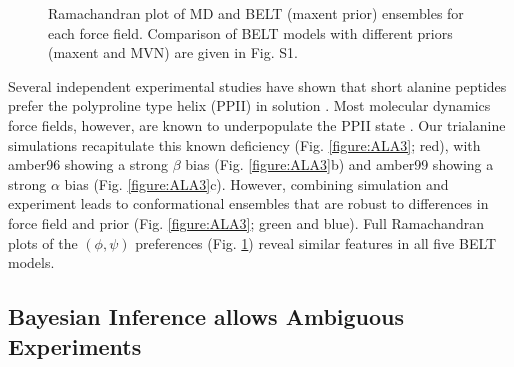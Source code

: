 \documentclass[11pt,titlepage]{article}
\begin{document}
\begin{figure}

\caption{
Ramachandran plot of MD and BELT (maxent prior) ensembles for each force field.  Comparison of BELT models with different priors (maxent and MVN) are given in Fig. S1.  
}
\label{figure:Rama}
\end{figure}

Several independent experimental studies have shown that short alanine peptides prefer the polyproline type helix (PPII) in solution \citep{Grdadolnik2011, Graf2007, Avbelj2006}.  Most molecular dynamics force fields, however, are known to underpopulate the PPII state \citep{Graf2007,beauchamp2012protein,Nerenberg2011, Best2008}.  Our trialanine simulations recapitulate this known deficiency (Fig. \ref{figure:ALA3}; red), with amber96 showing a strong $\beta$ bias (Fig. \ref{figure:ALA3}b) and amber99 showing a strong $\alpha$ bias (Fig. \ref{figure:ALA3}c).  However, combining simulation and experiment leads to conformational ensembles that are robust to differences in force field and prior (Fig. \ref{figure:ALA3}; green and blue).  Full Ramachandran plots of the $(\phi, \psi)$ preferences (Fig. \ref{figure:Rama}) reveal similar features in all five BELT models.  

\subsection*{Bayesian Inference allows Ambiguous Experiments}
\end{document}

